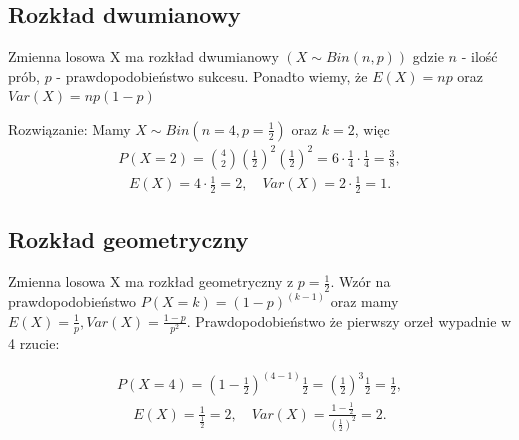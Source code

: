 \documentclass[12pt]{article}
\begin{document}
    \subsection{Rozkład dwumianowy}
    \begin{exercise}
        Zmienna losowa X ma rozkład dwumianowy $(X \sim Bin(n,p))$ gdzie $n$ - ilość prób, $p$ - prawdopodobieństwo sukcesu. Ponadto wiemy, że $E(X) = np$ oraz $Var(X)=np(1-p)$
    \end{exercise}
    Rozwiązanie:
    Mamy $X \sim Bin (n=4, p=\frac{1}{2})$ oraz $k=2$, więc
    \begin{align*}
        P(X=2)={{4}\choose{2}} \left(\frac{1}{2}\right) ^2 \left(\frac{1}{2}\right)^2=6\cdot\frac{1}{4} \cdot \frac{1}{4}=\frac{3}{8},
    \end{align*}
    \begin{align*}
        E(X)=4\cdot\frac{1}{2}=2, \quad Var(X)=2\cdot\frac{1}{2}=1.
    \end{align*}

    \subsection{Rozkład geometryczny}
    \begin{exercise}
        Zmienna losowa X ma rozkład geometryczny z $p = \frac{1}{2}$. Wzór na prawdopodobieństwo $P(X=k)=(1-p)^{(k-1)}$ oraz mamy $E(X)=\frac{1}{p}, Var(X)=\frac{1-p}{p^2}$. Prawdopodobieństwo że pierwszy orzeł wypadnie w 4 rzucie:
    \end{exercise}
    \begin{align*}
        P(X=4)=\left( 1-\frac{1}{2}\right)^{(4-1)}\frac{1}{2}=\left(\frac{1}{2}\right)^3\frac{1}{2}=\frac{1}{2},
    \end{align*}
    \begin{align*}
        E(X)=\frac{1}{\frac{1}{2}}=2, \quad Var(X)=\frac{1-\frac{1}{2}}{\left(\frac{1}{2}\right)^2}=2.
    \end{align*}
\end{document}
